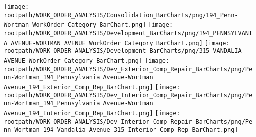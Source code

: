 \texttt{[image: \\rootpath/WORK\_ORDER\_ANALYSIS/Consolidation\_BarCharts/png/194\_Penn-Wortman\_WorkOrder\_Category\_BarChart.png]}
\texttt{[image: \\rootpath/WORK\_ORDER\_ANALYSIS/Development\_BarCharts/png/194\_PENNSYLVANIA AVENUE-WORTMAN AVENUE\_WorkOrder\_Category\_BarChart.png]}
\texttt{[image: \\rootpath/WORK\_ORDER\_ANALYSIS/Development\_BarCharts/png/315\_VANDALIA AVENUE\_WorkOrder\_Category\_BarChart.png]}
\texttt{[image: \\rootpath/WORK\_ORDER\_ANALYSIS/Dev\_Exterior\_Comp\_Repair\_BarCharts/png/Penn-Wortman\_194\_Pennsylvania Avenue-Wortman Avenue\_194\_Exterior\_Comp\_Rep\_BarChart.png]}
\texttt{[image: \\rootpath/WORK\_ORDER\_ANALYSIS/Dev\_Interior\_Comp\_Repair\_BarCharts/png/Penn-Wortman\_194\_Pennsylvania Avenue-Wortman Avenue\_194\_Interior\_Comp\_Rep\_BarChart.png]}
\texttt{[image: \\rootpath/WORK\_ORDER\_ANALYSIS/Dev\_Interior\_Comp\_Repair\_BarCharts/png/Penn-Wortman\_194\_Vandalia Avenue\_315\_Interior\_Comp\_Rep\_BarChart.png]}
